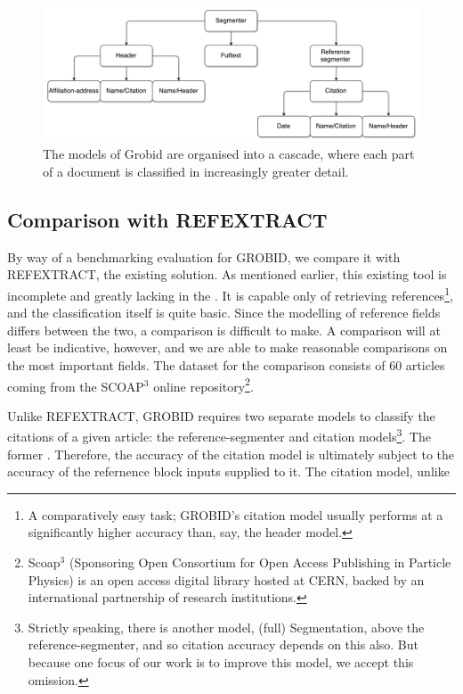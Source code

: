 \begin{figure}[!ht]
\center
\includegraphics[width=\textwidth]{Figures/cascade.pdf}
\caption{The models of Grobid are organised into a cascade, where each part of a document is classified in increasingly greater detail.}
\label{fig:cascade}
\end{figure}

\subsection{Comparison with REFEXTRACT}

By way of a benchmarking evaluation for GROBID, we compare it with REFEXTRACT, the existing solution. As mentioned earlier, this existing tool is incomplete and greatly lacking in the . It is capable only of retrieving references\footnote{A comparatively easy task; GROBID's citation model usually performs at a significantly higher accuracy than, say, the header model.}, and the classification itself is quite basic. Since the modelling of reference fields differs between the two, a comparison is difficult to make. A comparison will at least be indicative, however, and we are able to make reasonable comparisons on the most important fields. The dataset for the comparison consists of 60 articles coming from the SCOAP$^3$ online repository\footnote{Scoap$^3$ (Sponsoring Open Consortium for Open Access Publishing in Particle Physics) is an open access digital library hosted at CERN, backed by an international partnership of research institutions.}.

Unlike REFEXTRACT, GROBID requires two separate models to classify the citations of a given article: the reference-segmenter and citation models\footnote{Strictly speaking, there is another model, (full) Segmentation, above the reference-segmenter, and so citation accuracy depends on this also. But because one focus of our work is to improve this model, we accept this omission.}. The former . Therefore, the accuracy of the citation model is ultimately subject to the accuracy of the refernence block inputs supplied to it. The citation model, unlike

